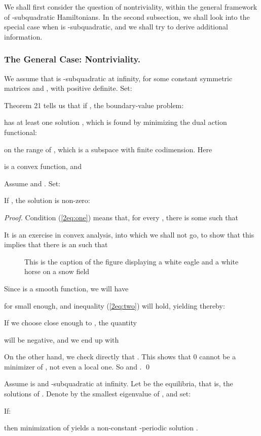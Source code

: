 \documentclass{llncs}
\begin{document}
We shall first consider the question of nontriviality, within the
general framework of
-subquadratic Hamiltonians. In
the second subsection, we shall look into the special case when  is
-subquadratic,
and we shall try to derive additional information.
\subsubsection{The General Case: Nontriviality.}
We assume that  is
-sub\-qua\-dra\-tic at infinity,
for some constant symmetric matrices  and ,
with  positive definite. Set:


Theorem 21 tells us that if , the boundary-value
problem:

has at least one solution
, which is found by minimizing the dual
action functional:

on the range of , which is a subspace 
with finite codimension. Here

is a convex function, and


\begin{proposition}
Assume  and . Set:


If ,
the solution  is non-zero:

\end{proposition}
\begin{proof}
Condition (\ref{2eq:one}) means that, for every
, there is some  such that


It is an exercise in convex analysis, into which we shall not go, to
show that this implies that there is an  such that


\begin{figure}
\vspace{2.5cm}
\caption{This is the caption of the figure displaying a white eagle and
a white horse on a snow field}
\end{figure}

Since  is a smooth function, we will have

for  small enough, and inequality (\ref{2eq:two}) will hold,
yielding thereby:


If we choose  close enough to , the quantity

will be negative, and we end up with


On the other hand, we check directly that . This shows
that 0 cannot be a minimizer of , not even a local one.
So  and
. \qed
\end{proof}
\begin{corollary}
Assume  is  and
-subquadratic at infinity. Let
  be the
equilibria, that is, the solutions of .
Denote by 
the smallest eigenvalue of , and set:

If:

then minimization of  yields a non-constant -periodic solution
.
\end{corollary}
\end{document}
